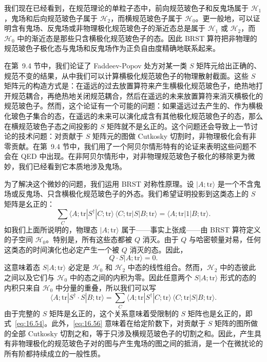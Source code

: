 我们现在已经看到，在规范理论的单粒子态中，前向规范玻色子和反鬼场属于 $\mathcal{H}_1$，鬼场和后向规范玻色子属于 $\mathcal{H}_2$，而横规范玻色子属于 $\mathcal{H}_0$。更一般地，可以证明含有鬼场、反鬼场或非物理极化规范玻色子的渐近态总是属于 $\mathcal{H}_1$ 或 $\mathcal{H}_2$，而 $\mathcal{H}_0$ 中的渐近态是那些只含横极化规范玻色子的态。因此 BRST 算符把非物理的规范玻色子极化态与鬼场和反鬼场作为正负自由度精确地联系起来。

在第~9.4 节中，我们论证了 Faddeev-Popov 处方对某一类 $S$ 矩阵元给出正确的、规范不变的结果，从中我们可以计算横极化规范玻色子的物理散射截面。这些 $S$ 矩阵元的构造方式是：在遥远的过去放置算符来产生横极化规范玻色子，绝热地打开规范耦合，再绝热地关闭规范耦合，然后在遥远的未来放置算符来消灭横极化的规范玻色子。然而，这个论证有一个可能的问题：如果遥远过去产生的、作为横极化玻色子集合的态，在遥远的未来可以演化成含有其他极化规范玻色子的态，那么在横规范玻色子态之间投影的 $S$ 矩阵就不是幺正的。这个问题还会导致上一节讨论的技术问题：对贡献于 $S$ 矩阵元的图做 Cutkosky 切割时，非物理极化会有非零贡献。在第~9.4 节中，我们用了一个阿贝尔情形特有的论证来表明这些问题不会在 QED 中出现。在非阿贝尔情形中，对非物理规范玻色子极化的移除更为微妙，我们已经看到它本质地涉及鬼场。

为了解决这个微妙的问题，我们运用 BRST 对称性原理。设 $|A;\mathrm{tr}\rangle$ 是一个不含鬼场或反鬼场、只含横极化规范玻色子的外态。我们希望证明投影到这类态上的 $S$ 矩阵是幺正的：
\begin{equation}
  \sum_C \langle A;\mathrm{tr}|S^{\dagger}|C;\mathrm{tr}\rangle\,
    \langle C;\mathrm{tr}|S|B;\mathrm{tr}\rangle
  = \langle A;\mathrm{tr}|1|B;\mathrm{tr}\rangle .
  \label{eq:16.54}
\end{equation}
如我们上面所说明的，物理态 $|A;\mathrm{tr}\rangle$ 属于——事实上张成——由 BRST 算符定义的子空间 $\mathcal{H}_0$。特别是，所有这些态都被 $Q$ 消灭。由于 $Q$ 与哈密顿量对易，任何这类态的时间演化也必定产生一个被 $Q$ 消灭的态。因此，
\begin{equation}
  Q\cdot S|A;\mathrm{tr}\rangle = 0 .
  \label{eq:16.55}
\end{equation}
这意味着态 $S|A;\mathrm{tr}\rangle$ 必定是 $\mathcal{H}_0$ 和 $\mathcal{H}_2$ 中态的线性组合。然而，$\mathcal{H}_2$ 中的态彼此之间以及它们与 $\mathcal{H}_0$ 中的态之间的内积为零。因此任意两个 $S|A;\mathrm{tr}\rangle$ 形式的态的内积只来自 $\mathcal{H}_0$ 中分量的重叠，所以我们可以写
\begin{equation}
  \langle A;\mathrm{tr}|S^{\dagger}\cdot S|B;\mathrm{tr}\rangle
  = \sum_C \langle A;\mathrm{tr}|S^{\dagger}|C;\mathrm{tr}\rangle\,
    \langle C;\mathrm{tr}|S|B;\mathrm{tr}\rangle .
  \label{eq:16.56}
\end{equation}
由于完整的 $S$ 矩阵是幺正的，这个关系意味着受限制的 $S$ 矩阵也是幺正的，即式~\eqref{eq:16.54}。此外，\eqref{eq:16.56} 意味着在给定阶数下，对贡献于 $S$ 矩阵的图所做的全部 Cutkosky 切割之和，等于只涉及横规范玻色子的切割之和。因此，产生具有非物理极化的规范玻色子对的图与产生鬼场的图之间的抵消，是一个在微扰论的所有阶都持续成立的一般性质。

